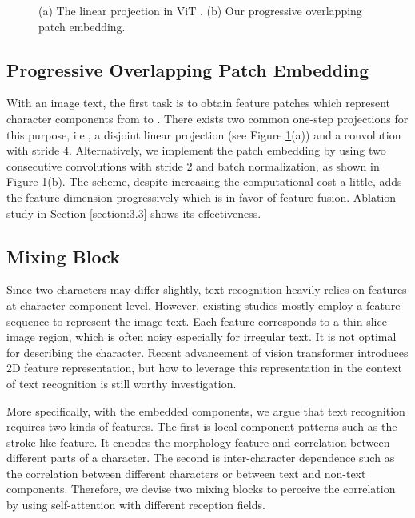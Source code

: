 \documentclass{article}
\begin{document}
\begin{figure}[t]
	\centering  
	\subfigbottomskip=2pt
	\subfigcapskip=-5pt
\caption{(a) The linear projection in ViT \protect\cite{dosovitskiy2020vit}. (b) Our progressive overlapping patch embedding.}
\label{fig:3}
\end{figure}
\subsection{Progressive Overlapping Patch Embedding}
With an image text, the first task is to obtain feature patches which represent character components from  to . 
There exists two common one-step projections for this purpose, i.e., a  disjoint linear projection (see Figure \ref{fig:3}(a)) and a  convolution with stride 4.
Alternatively, we implement the patch embedding by using two consecutive  convolutions with stride 2 and batch normalization, as shown in Figure \ref{fig:3}(b). The scheme, despite increasing the computational cost a little, adds the feature dimension progressively which is in favor of feature fusion. Ablation study in Section \ref{section:3.3} shows its effectiveness. 




\subsection{Mixing Block}

Since two characters may differ slightly, text recognition heavily relies on features at character component level. However, existing studies mostly employ a feature sequence to represent the image text. Each feature corresponds to a thin-slice image region, which is often noisy especially for irregular text. It is not optimal for describing the character. Recent advancement of vision transformer introduces 2D feature representation, but how to leverage this representation in the context of text recognition is still worthy investigation.

More specifically, with the embedded components, we argue that text recognition requires two kinds of features. The first is local component patterns such as the stroke-like feature. It encodes the morphology feature and correlation between different parts of a character. The second is inter-character dependence such as the correlation between different characters or between text and non-text components. Therefore, we devise two mixing blocks to perceive the correlation by using self-attention with different reception fields.
\end{document}
